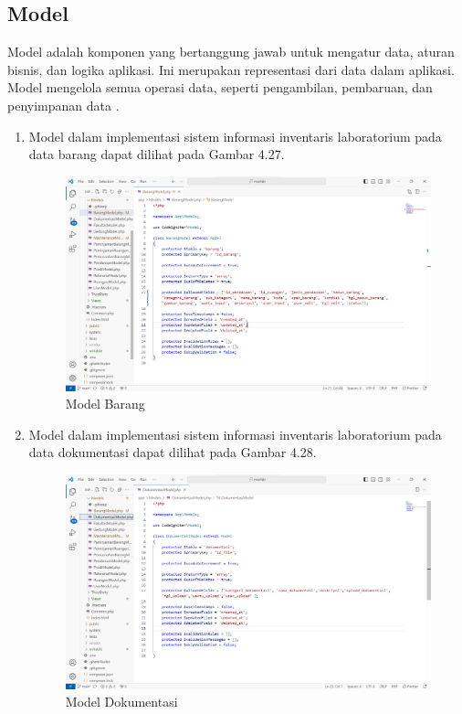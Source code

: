 \subsection{Model}
Model adalah komponen yang bertanggung jawab untuk mengatur data, aturan bisnis, dan logika aplikasi. Ini merupakan representasi dari data dalam aplikasi. Model mengelola semua operasi data, seperti pengambilan, pembaruan, dan penyimpanan data \cite{firdaus2020rancang}.

\begin{enumerate}
  \item Model dalam implementasi sistem informasi inventaris laboratorium pada data barang dapat dilihat pada Gambar 4.27.

        \begin{figure}
          \centering
          \includegraphics[width=0.82\linewidth]{konten//gambar/barang model.png}
          \caption{Model Barang}
          \label{fig:enter-label}
        \end{figure}

  \item Model dalam implementasi sistem informasi inventaris laboratorium pada data dokumentasi dapat dilihat pada Gambar 4.28.

        \begin{figure}
          \centering
          \includegraphics[width=0.82\linewidth]{konten//gambar/dokumentasi model.png}
          \caption{Model Dokumentasi}
          \label{fig:enter-label}
        \end{figure}


\end{enumerate}
